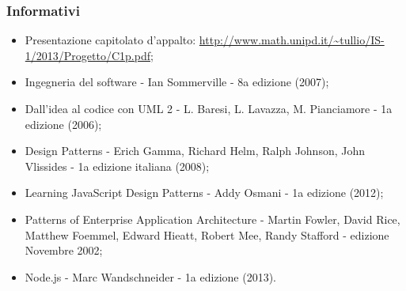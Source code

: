 		\subsubsection{Informativi}
		
		\begin{itemize}
		\item Presentazione capitolato d'appalto: \url{http://www.math.unipd.it/~tullio/IS-1/2013/Progetto/C1p.pdf};
		\item Ingegneria del software - Ian Sommerville - 8a edizione (2007);
		\item Dall’idea al codice con UML 2 - L. Baresi, L. Lavazza, M. Pianciamore - 1a edizione
(2006);
		\item Design Patterns - Erich Gamma, Richard Helm, Ralph Johnson, John Vlissides - 1a edizione italiana (2008);
		\item Learning JavaScript Design Patterns - Addy Osmani - 1a edizione (2012);
		\item Patterns of Enterprise Application Architecture - Martin Fowler, David Rice, Matthew Foemmel, Edward Hieatt, Robert Mee, Randy Stafford - edizione Novembre 2002;
		\item Node.js - Marc Wandschneider - 1a edizione (2013).
		
		\end{itemize}
		
	\pagebreak
